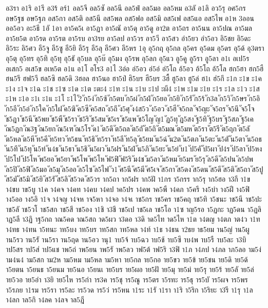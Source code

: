 {อ3รา
อ1ริ
อ1รี
อ3ร้
อร์1
อล5จี
อล5ซั
อล5นี
อล5ฟ่
อล5มอ
อล5หม
อ3ลั
อ1ลิ
อว5รุ
อศ5กร
อษ5ฐช
อษ5ฐภ
อส5กา
อส5ติ
อส5นี
อส5พล
อส5ฟอ
อส5มิ
อส5เฟ
อส5แอ
อส5ไพ
อ1ห
3ออน
ออ5อว
อะ5ธี
1อั
1อา
อา5ค5เ
อา5ฏา
อา5ณั
อา5ดุ
อา5ดู
อา2ต
อา5ถร
อา5นน
อา5ปณ
อา5มล
อา5ย5ต
อา5รด
อา5รต
อา5รบ
อา3รย
อา5ลป
อา5วร
อา5วี
อา5สว
อำ5ยว
อำ5อว
อิ5ชย
อิ5ดะ
อิ5ระ
อิ5ศว
อี5จู
อี5ซู
อี5ยิ
อี5รุ
อี5ลุ
อี5ศว
อี5หร
1อุ
อุ5กฤ
อุ5กล
อุ5คร
อุ5ดม
อุ5ดร
อุ5ด้
อุ3ตรา
อุ5ตุ
อุ5ทร
อุ5ทิ
อุ5ทุ
อุ5ธั
อุ5บล
อุ5บ๊
อุ5มง
อุ5รพ
อุ5ลก
อุ5แว
อู5คู
อู5รา
อู5ลา
อ1เ
อเป5ร
อเสก5
อเส5ข
อเห5ต
อ1แ
อ1โ
อโร3
อ1ไ
3อ่อ
อ่5อว
อ่5อ่
อ่5โถ
อ้5อว
อ้5โถ
อ้5โล
ฮก5ฮา
ฮก5ฮื
ฮน5รี
ฮฟ5วี
ฮล5ซิ
ฮล5ดิ
3ฮอล
ฮา5นอ
ฮา5ป่
ฮิ5บร
ฮี5บร
3ฮื้
ฮู5ลา
ฮู5ล่
ฮ1เ
ฮ่5กึ
ะ1ก
ะ1ข
ะ1ค
ะ1ง
ะ1จ
ะ1ฉ
ะ1ช
ะ1ซ
ะ1ด
ะ1ต
ะตะ4
ะ1ท
ะ1น
ะ1บ
ะ1ป
ะผี4
ะ1พ
ะ1ม
ะ1ย
ะ1ร
ะ1ล
ะ1ว
ะ1ส
ะ1ห
ะ1อ
ะ1เ
ะ1แ
ะ1โ
ะ1ไ
ั2
ัก5ง่
ัก5ซ้
ัก5ตบ
ัก5ผ่
ัก5ฝ่
ัก5ยอ
ัก5ยิ
ัก5รั
ัก5ร้
ัก3ล
ัก5วิ
ัก5ษร
ัก5อิ
ัก5อี
ัก5อ่
ัก5ใค
ัก5ใฝ
ัค5ฆิ
ัค5ซี
ัค5สถ
ัง5ถึ
ัง5ศุ
ัง4ส5ว
ัง5อว
ัง5ฮี
ัจ5กล
ัจ5ญะ
ัจ5ถร
ัจ5นึ
ัจ5โจ
ัช5ฎา
ัช5นี
ัช5พย
ัช5พื
ัช5รา
ัช5ริ
ัช5สม
ัช5เร
ัช5แพ
ัช5โญ
ัญ1
ัฏ5ทุ
ัฏ5สง
ัฐ5ทิ
ัฐ5บร
ัฐ5สภ
ัฐ5เค
ัณ5ฏก
ัณ3ฐ
ัณ5ยก
ัณ5เฑ
ัณ5โร
ัด1
ัต5ดึ
ัต5ถล
ัต5ถั
ัต5ถิ
ัต5มณ
ัต5มห
ัต5รา
ัต5รี
ัต5ฤก
ัต5ลั
ัต5หล
ัต5หี
ัท5คี
ัท5ทว
ัท5ธน
ัท5ธิ
ัท5รา
ัท5ลี
ัท5ลุ
ัธ5ยม
ัน5ฉ่
ัน2ต
ัน5ตภ
ัน5ตะ
ัน5ตั
ัน5ตา
ัน5ถธ
ัน5ทึ
ัน5ทุ
ัน5ท่
ัน4ธ
ัน5ธา
ัน5ธิ
ัน5ผว
ัน5ฝร
ัน5ฝ่
ัน5ภิ
ัน5ยะ
ัน5ย่
ับ1
ัป5คั
ัป5ผา
ัป4ร
ัป5ลา
ัป5หง
ัป5โป
ัป5โห
ัพ5ยอ
ัพ5ยา
ัพ5โพ
ัพ5โห
ัฟ5ฟิ
ัฟ5ริ
ัม4ช
ัม5ลา
ัม5หม
ัย5มร
ัย5รุ
ัล5ดี
ัล5ปน
ัล5ปพ
ัล5ปิ
ัล5ฟิ
ัล5มอ
ัล5มุ
ัล5ออ
ัล5ไซ
ัล5ไฟ
ัว1
ัศ5นี
ัศ5มี
ัศ5เจ
ัส5กา
ัส5ดง
ัส5ดน
ัส5ดี
ัส5ติ
ัส5ถา
ัส5ปู
ัส5มั
ัส5มิ
ัส5ยิ
ัส5รั
ัส5ลิ
ัส5วด
ัส5วร
าก5ถา
าก5ฝร
าก5ฝั
า1กร
า5กรร
าก5รุ
าก5ฮอ
า3กี
า1ข
า4ขบ
าข5บู
า1ค
า4คจ
า4คท
า4คบ
า4คป
าค5ปร
า4คพ
าค5พื
า4คภ
า5ครี
าง5บำ
าง5ฝี
าง5ฟิ
าง5ออ
าง5อิ
า1จ
า4จญ
า4จห
าจ5หา
า4จอ
า4จเ
าช5กร
าช5คร
าช5คฤ
าช5ทิ
า5ชนะ
าช5นี
าช5ปะ
าช5ลั
าช5วโ
าช5สก
าช5สี
าช5อง
า1ชิ
า3ชี
าช5เป
าช5เล
าช5โอ
า1ซ
าญ5รอ
า5ฏกะ
าฏ5ดน
า5ฏลิ
าฏ5ลี
า3ฏิ
าฐ5กถ
าณ5คด
าณ5สถ
าด5ผว
า3ดอ
า3ดิ
าด5ไท
าด5ไห
า1ต
า4ตญ
า4ตภ
าต4ว
า1ท
า4ทธ
า4ทน
า5ทนะ
าท5บง
าท5บร
าท5สก
าท5หล
า4ท์
า1ธ
า4ธน
า2ธย
าธ5ยม
าน5ญ่
าน5ผู
าน5รว
าน5รั
าน5รา
าน5ฤด
าน5อว
านุ1
าบ5จ้
าบ5ฉว
าบ5ช้
าบ5ซึ
าบ4พ
าบ5รื
าบ5ละ
า3บิ
าป5สร
าป5ส่
าป5แช
าพ5ถ่
าพ5ยน
าพ5รั
าพ5ลว
าฟ5ต้
าฟ5ริ
า3ฟิ
า1ภ
า4ภป
า4ภล
าภ5ลอ
าม5ง่
าม4น4
าม5สก
าม2ห
าม5หม
าม5หล
าม5หา
าย5กล
าย5กอ
าย5ขว
าย5ข้
าย5ชน
าย5ดิ
าย5ด้
า5ยตน
า5ยนธ
า5ยนม
าย5นอ
า5ยนเ
าย5บร
าย5ผอ
าย5ฝั
าย5มุ
าย5ม่
าย5รุ
าย5ร้
าย5ลั
าย5ล่
าย5วอ
าย5อำ
า3ยิ
าย5ไห
าร5กำ
าร3ค
าร5ชุ
าร5ณู
าร5ตร
า5รทะ
าร5ธุ
าร5บั
าร5ผจ
าร5พร
า5รภย
า1รม
าร5รา
าร5ละ
าร5วด
าร5ว่
าร5หน
า1ระ
า1รั
า1รา
า1ริ
า5ริก
า5ริยะ
า3รี
า1รุ
า1ล
า4ลก
าล5กิ
า4ลค
า4ลจ
าล5ฎี
}
